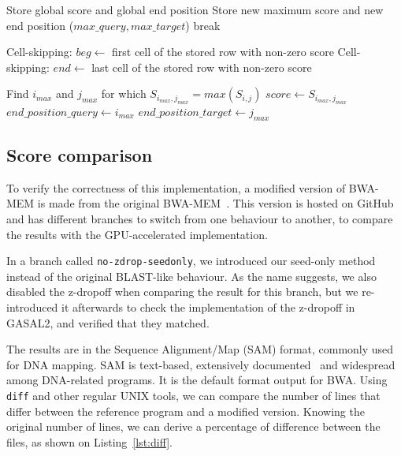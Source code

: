 \begin{algorithm}[h!]
\begin{algorithmic}[1]
		
		\EndFor %
		\EndFor %
		\State Store global score and global end position
		\EndIf
		\State Store new maximum score and new end position ($max\_query, max\_target$)
		\State break
		\EndIf
		\EndIf
		
		\State Cell-skipping: $beg \leftarrow$ first cell of the stored row with non-zero score
		\State Cell-skipping: $end \leftarrow$ last cell of the stored row with non-zero score
		\EndFor %
		\EndFor %
		
		\State Find $i_{max}$ and $j_{max}$ for which $S_{i_{max}, j_{max}} = max(S_{i,j})$
		\State $score \leftarrow S_{i_{max}, j_{max}}$
		\State $end\_position\_query \leftarrow i_{max}$
		\State $end\_position\_target \leftarrow j_{max}$
		
		\EndProcedure
		
	\end{algorithmic}
\end{algorithm}


\subsection{Score comparison}

To verify the correctness of this implementation, a modified version of BWA-MEM is made from the original BWA-MEM~\cite{lh3:bwa}. This version is hosted on GitHub~\cite{j-levy:bwa} and has different branches to switch from one behaviour to another, to compare the results with the GPU-accelerated implementation.

In a branch called \verb|no-zdrop-seedonly|, we introduced our seed-only method instead of the original BLAST-like behaviour. As the name suggests, we also disabled the z-dropoff when comparing the result for this branch, but we re-introduced it afterwards to check the implementation of the z-dropoff in GASAL2, and verified that they matched.

The results are in the Sequence Alignment/Map (SAM) format, commonly used for DNA mapping. SAM is text-based, extensively documented~\cite{samtools:sam} and widespread among DNA-related programs. It is the default format output for BWA. Using \verb|diff| and other regular UNIX tools, we can compare the number of lines that differ between the reference program and a modified version. Knowing the original number of lines, we can derive a percentage of difference between the files, as shown on Listing~\ref{lst:diff}.

